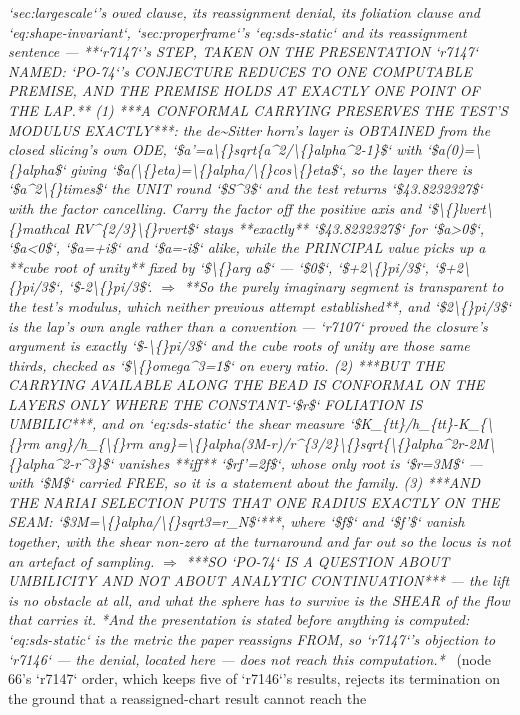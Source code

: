 \begin{description}
\textit{`sec:largescale`'s owed clause, its reassignment denial, its foliation clause and `eq:shape-invariant`, `sec:properframe`'s `eq:sds-static` and its reassignment sentence ---  **`r7147`'s STEP, TAKEN ON THE PRESENTATION `r7147` NAMED: `PO-74`'s CONJECTURE REDUCES TO ONE COMPUTABLE PREMISE, AND THE PREMISE HOLDS AT EXACTLY ONE POINT OF THE LAP.** (1) ***A CONFORMAL CARRYING PRESERVES THE TEST'S MODULUS EXACTLY***: the de\textasciitilde{}Sitter horn's layer is OBTAINED from the closed slicing's own ODE, `\$a'=a\textbackslash\{\}sqrt\{a\textasciicircum{}2/\textbackslash\{\}alpha\textasciicircum{}2-1\}\$` with `\$a(0)=\textbackslash\{\}alpha\$` giving `\$a(\textbackslash\{\}eta)=\textbackslash\{\}alpha/\textbackslash\{\}cos\textbackslash\{\}eta\$`, so the layer there is `\$a\textasciicircum{}2\textbackslash\{\}times\$` the UNIT round `\$S\textasciicircum{}3\$` and the test returns `\$43.8232327\$` with the factor cancelling. Carry the factor off the positive axis and `\$\textbackslash\{\}lvert\textbackslash\{\}mathcal RV\textasciicircum{}\{2/3\}\textbackslash\{\}rvert\$` stays **exactly** `\$43.8232327\$` for `\$a>0\$`, `\$a<0\$`, `\$a=+i\$` and `\$a=-i\$` alike, while the PRINCIPAL value picks up a **cube root of unity** fixed by `\$\textbackslash\{\}arg a\$` --- `\$0\$`, `\$+2\textbackslash\{\}pi/3\$`, `\$+2\textbackslash\{\}pi/3\$`, `\$-2\textbackslash\{\}pi/3\$`. \ensuremath{\Rightarrow} **So the purely imaginary segment is transparent to the test's modulus, which neither previous attempt established**, and `\$2\textbackslash\{\}pi/3\$` is the lap's own angle rather than a convention --- `r7107` proved the closure's argument is exactly `\$-\textbackslash\{\}pi/3\$` and the cube roots of unity are those same thirds, checked as `\$\textbackslash\{\}omega\textasciicircum{}3=1\$` on every ratio.  (2) ***BUT THE CARRYING AVAILABLE ALONG THE BEAD IS CONFORMAL ON THE LAYERS ONLY WHERE THE CONSTANT-`\$r\$` FOLIATION IS UMBILIC***, and on `eq:sds-static` the shear measure `\$K\_\{tt\}/h\_\{tt\}-K\_\{\textbackslash\{\}rm ang\}/h\_\{\textbackslash\{\}rm ang\}=\textbackslash\{\}alpha(3M-r)/r\textasciicircum{}\{3/2\}\textbackslash\{\}sqrt\{\textbackslash\{\}alpha\textasciicircum{}2r-2M\textbackslash\{\}alpha\textasciicircum{}2-r\textasciicircum{}3\}\$` vanishes **iff** `\$rf'=2f\$`, whose only root is `\$r=3M\$` --- with `\$M\$` carried FREE, so it is a statement about the family.  (3) ***AND THE NARIAI SELECTION PUTS THAT ONE RADIUS EXACTLY ON THE SEAM: `\$3M=\textbackslash\{\}alpha/\textbackslash\{\}sqrt3=r\_N\$`***, where `\$f\$` and `\$f'\$` vanish together, with the shear non-zero at the turnaround and far out so the locus is not an artefact of sampling. \ensuremath{\Rightarrow} ***SO `PO-74` IS A QUESTION ABOUT UMBILICITY AND NOT ABOUT ANALYTIC CONTINUATION*** --- the lift is no obstacle at all, and what the sphere has to survive is the SHEAR of the flow that carries it.  *And the presentation is stated before anything is computed: `eq:sds-static` is the metric the paper reassigns FROM, so `r7147`'s objection to `r7146` --- the denial, located here --- does not reach this computation.*} \ (node 66's `r7147` order, which keeps five of `r7146`'s results, rejects its termination on the ground that a reassigned-chart result cannot reach the 
\end{description}
